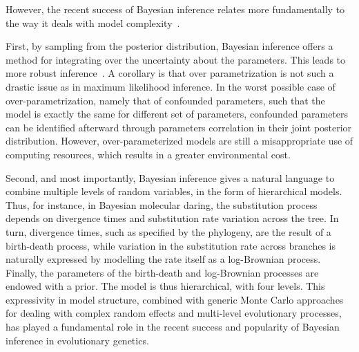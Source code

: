 However, the recent success of Bayesian inference relates more fundamentally to the way it deals with model complexity~\citep{Huelsenbeck2000a,Lartillot2020}.

First, by sampling from the posterior distribution, Bayesian inference offers a method for integrating over the uncertainty about the parameters.
This leads to more robust inference~\citep{Huelsenbeck2000a}.
A corollary is that over parametrization is not such a drastic issue as in maximum likelihood inference.
In the worst possible case of over-parametrization, namely that of confounded parameters, such that the model is exactly the same for different set of parameters, confounded parameters can be identified afterward through parameters correlation in their joint posterior distribution.
However, over-parameterized models are still a misappropriate use of computing resources, which results in a greater environmental cost.

Second, and most importantly, Bayesian inference gives a natural language to combine multiple levels of random variables, in the form of hierarchical models.
Thus, for instance, in Bayesian molecular daring, the substitution process depends on divergence times and substitution rate variation across the tree.
In turn, divergence times, such as specified by the phylogeny, are the result of a birth-death process, while variation in the substitution rate across branches is naturally expressed by modelling the rate itself as a log-Brownian process.
Finally, the parameters of the birth-death and log-Brownian processes are endowed with a prior.
The model is thus hierarchical, with four levels.
This expressivity in model structure, combined with generic Monte Carlo approaches for dealing with complex random effects and multi-level evolutionary processes, has played a fundamental role in the recent success and popularity of Bayesian inference in evolutionary genetics.


